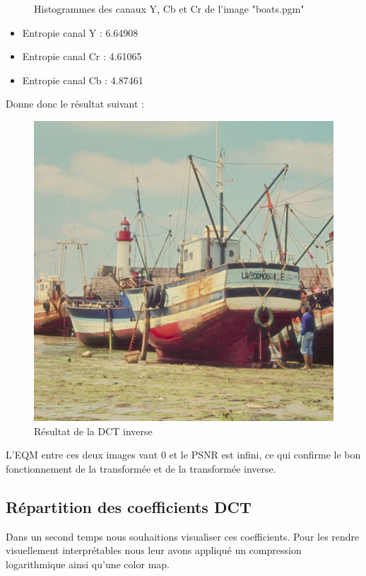 \documentclass[12pt]{report}
\begin{document}
\begin{figure}[H]
\begin{center}
\caption{Histogrammes des canaux Y, Cb et Cr de l'image "boats.pgm"}
\end{center}
\end{figure}

\begin{itemize}
\item Entropie canal Y : 6.64908
\item Entropie canal Cr : 4.61065
\item Entropie canal Cb : 4.87461
\end{itemize}

Donne donc le résultat suivant :

\begin{figure}[H]
\begin{center}
\includegraphics[scale=0.5]{../ImageRes/idct_result.jpg} 
\caption{Résultat de la DCT inverse}
\end{center}
\end{figure}

L'EQM entre ces deux images vaut 0 et le PSNR est infini, ce qui confirme le bon fonctionnement de la transformée et de la transformée inverse.

\subsection{Répartition des coefficients DCT}
Dans un second temps nous souhaitions visualiser ces coefficients. Pour les rendre visuellement interprétables nous leur avons appliqué un compression logarithmique ainsi qu'une color map.\\
\end{document}
